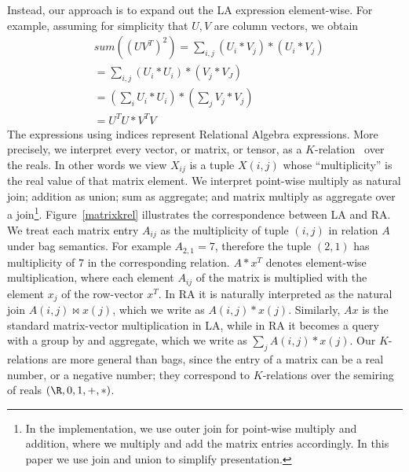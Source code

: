 Instead, our approach is to expand out the LA expression element-wise.
For example, assuming for simplicity that $U,V$ are column vectors, we
obtain
\begin{align*}
& sum((UV^T)^2) = \textstyle{\sum_{i,j}} (U_i * V_j) * (U_i * V_j) \\
& = \textstyle{\sum_{i,j}}(U_i * U_i) * (V_j * V_J) \\
& = ( \textstyle{\sum_i} U_i * U_i) * ( \textstyle{\sum_j} V_j * V_j)  \\
& = U^TU * V^TV
\end{align*}
%
The expressions using indices represent Relational Algebra
expressions.  More precisely, we interpret every vector, or matrix, or
tensor, as a $K$-relation~\cite{DBLP:conf/pods/GreenKT07} over the
reals. In other words we view $X_{ij}$ is a tuple $X(i,j)$ whose
``multiplicity'' is the real value of that matrix element.  We
interpret point-wise multiply as natural join; addition as union; sum
as aggregate; and matrix multiply as aggregate over a join\footnote{In
  the implementation, we use outer join for point-wise multiply and
  addition, where we multiply and add the matrix entries
  accordingly. In this paper we use join and union to simplify
  presentation.}.
%
Figure~\ref{matrixkrel} illustrates the correspondence between LA and
RA.  We treat each matrix entry $A_{ij}$ as the multiplicity of tuple
$(i, j)$ in relation $A$ under bag semantics. For example
$A_{2,1} = 7$, therefore the tuple $(2,1)$ has multiplicity of $7$ in
the corresponding relation.  $A*x^T$ denotes element-wise
multiplication, where each element $A_{ij}$ of the matrix is
multiplied with the element $x_j$ of the row-vector $x^T$.  In RA it
is naturally interpreted as the natural join $A(i,j) \Join x(j)$,
which we write as $A(i,j)*x(j)$.  Similarly, $Ax$ is the standard
matrix-vector multiplication in LA, while in RA it becomes a query
with a group by and aggregate, which we write as $\sum_j A(i,j)*x(j)$.
Our $K$-relations are more general than bags, since the entry of a
matrix can be a real number, or a negative number; they correspond to
$K$-relations over the semiring of reals $(\R, 0, 1, +, *)$.

